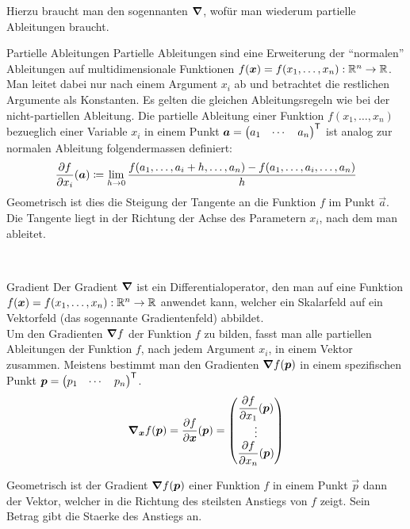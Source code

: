 Hierzu braucht man den sogennanten  $\bm{\nabla}$, wofür man wiederum partielle Ableitungen braucht.
\para{}
\begin{defbox}{Partielle Ableitungen}\label{ref:partielle_ableitungen}
  Partielle Ableitungen sind eine Erweiterung der ``normalen'' Ableitungen auf
  multidimensionale Funktionen $f(\bm{x}) = f(x_1,\ldots,x_n): \mathbb{R}^n \to \mathbb{R}$.
  Man leitet dabei nur nach einem Argument $x_i$ ab und betrachtet die restlichen Argumente als Konstanten.
  Es gelten die gleichen Ableitungsregeln wie bei der nicht-partiellen Ableitung.
  Die partielle Ableitung einer Funktion $f(x_1,\ldots,x_n)$ bezueglich einer
  Variable $x_i$ in einem Punkt $\bm{a} = \begin{pmatrix} a_1 & \cdots & a_n \end{pmatrix}^{\mathsf{T}}$
  ist analog zur normalen Ableitung folgendermassen definiert:
  \begin{equation*}
    \frac{\partial f}{\partial x_i}(\bm{a}) \coloneqq \lim_{h \to 0} \frac{f(a_1,\ldots,a_i + h,\ldots,a_n)-f(a_1,\ldots,a_i,\ldots,a_n)}{h}
  \end{equation*}
  Geometrisch ist dies die Steigung der Tangente an die Funktion $f$ im Punkt
  $\vec{a}$. Die Tangente liegt in der Richtung der Achse des Parametern $x_i$, nach dem man ableitet.
\end{defbox}
\\
\begin{defbox}{Gradient}
  Der Gradient $\bm{\nabla}$ ist ein Differentialoperator, den man auf eine
  Funktion $f(\bm{x}) = f(x_1,\ldots,x_n): \mathbb{R}^n \to \mathbb{R}$ anwendet kann, welcher ein Skalarfeld auf ein Vektorfeld (das sogennante Gradientenfeld) abbildet.\\
  Um den Gradienten $\bm{\nabla}f$ der Funktion $f$ zu bilden, fasst man alle partiellen Ableitungen der Funktion $f$, nach jedem
  Argument $x_i$, in einem Vektor zusammen. Meistens bestimmt man den Gradienten
  $\bm{\nabla} f(\bm{p})$ in einem spezifischen Punkt $\bm{p} =
  \begin{pmatrix} p_1 & \cdots & p_n \end{pmatrix}^{\mathsf{T}}$.
  \begin{equation*}
    \bm{\nabla}_{\bm{x}} f(\bm{p}) = \displaystyle\frac{\partial f}{\partial \bm{x}}(\bm{p}) =
    \begin{pmatrix}
      \displaystyle\frac{\partial f}{\partial x_1}(\bm{p}) \\
      \vdots \\
      \displaystyle\frac{\partial f}{\partial x_n}(\bm{p}) \\
    \end{pmatrix}
  \end{equation*}

  Geometrisch ist der Gradient $\bm{\nabla}f(\bm{p})$ einer Funktion $f$ in
  einem Punkt $\vec{p}$ dann der Vektor, welcher in die Richtung des steilsten
  Anstiegs von $f$ zeigt. Sein Betrag gibt die Staerke des Anstiegs an.
\end{defbox}
